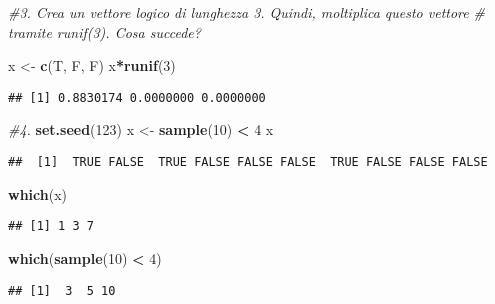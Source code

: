 \documentclass[
]{article}
\newenvironment{Shaded}{\begin{snugshade}}{\end{snugshade}}
\newcommand{\CommentTok}[1]{\textcolor[rgb]{0.56,0.35,0.01}{\textit{#1}}}
\newcommand{\DecValTok}[1]{\textcolor[rgb]{0.00,0.00,0.81}{#1}}
\newcommand{\FunctionTok}[1]{\textcolor[rgb]{0.13,0.29,0.53}{\textbf{#1}}}
\newcommand{\NormalTok}[1]{#1}
\newcommand{\OtherTok}[1]{\textcolor[rgb]{0.56,0.35,0.01}{#1}}
\newcommand{\SpecialCharTok}[1]{\textcolor[rgb]{0.81,0.36,0.00}{\textbf{#1}}}
\begin{document}
\begin{Shaded}
\begin{Highlighting}[]
\CommentTok{\#3. Crea un vettore logico di lunghezza 3. Quindi, moltiplica questo vettore}
\CommentTok{\# tramite runif(3). Cosa succede?}

\NormalTok{x }\OtherTok{\textless{}{-}} \FunctionTok{c}\NormalTok{(T, F, F)}
\NormalTok{x}\SpecialCharTok{*}\FunctionTok{runif}\NormalTok{(}\DecValTok{3}\NormalTok{)}
\end{Highlighting}
\end{Shaded}

\begin{verbatim}
## [1] 0.8830174 0.0000000 0.0000000
\end{verbatim}

\begin{Shaded}
\begin{Highlighting}[]
\CommentTok{\#4.}
\FunctionTok{set.seed}\NormalTok{(}\DecValTok{123}\NormalTok{)}
\NormalTok{x }\OtherTok{\textless{}{-}} \FunctionTok{sample}\NormalTok{(}\DecValTok{10}\NormalTok{) }\SpecialCharTok{\textless{}} \DecValTok{4}
\NormalTok{x}
\end{Highlighting}
\end{Shaded}

\begin{verbatim}
##  [1]  TRUE FALSE  TRUE FALSE FALSE FALSE  TRUE FALSE FALSE FALSE
\end{verbatim}

\begin{Shaded}
\begin{Highlighting}[]
\FunctionTok{which}\NormalTok{(x)}
\end{Highlighting}
\end{Shaded}

\begin{verbatim}
## [1] 1 3 7
\end{verbatim}

\begin{Shaded}
\begin{Highlighting}[]
\FunctionTok{which}\NormalTok{(}\FunctionTok{sample}\NormalTok{(}\DecValTok{10}\NormalTok{) }\SpecialCharTok{\textless{}} \DecValTok{4}\NormalTok{)}
\end{Highlighting}
\end{Shaded}

\begin{verbatim}
## [1]  3  5 10
\end{verbatim}
\end{document}
